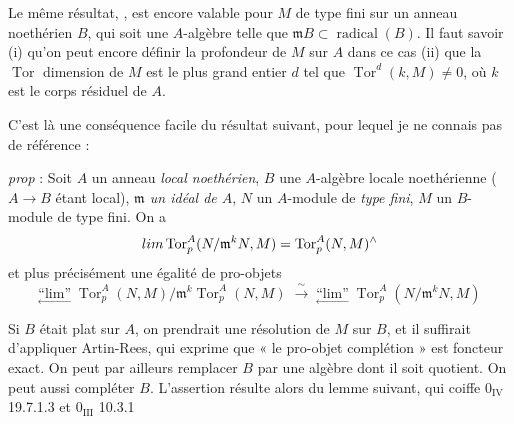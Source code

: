 \documentclass[11pt,a4paper]{article}
\begin{document}

Le même résultat, , est encore valable pour $M$ de type fini sur un
anneau  noethérien $B$, qui soit une $A$-algèbre telle que
$\mathfrak{m} B \subset \operatorname{radical}(B)$. Il faut savoir (i) qu'on
peut encore définir la profondeur de $M$ sur $A$ dans ce cas (ii) que la
$\operatorname{Tor}$ dimension de $M$ est le plus grand entier $d$ tel que
$\operatorname{Tor}^d(k, M) \neq 0$, où $k$ est le corps résiduel de $A$.

C'est là une conséquence facile du résultat suivant, pour lequel je ne
connais pas de référence :

\emph{prop} : Soit $A$ un anneau \emph{local noethérien}, $B$ une
$A$-algèbre locale noethérienne ($A \to B$ étant local),
\emph{$\mathfrak{m}$ un idéal de $A$}, $N$ un $A$-module de
\emph{type fini}, $M$ un $B$-module de type fini. On a
\[
  \varprojlim \operatorname{Tor}_p^A(N / \mathfrak{m}^k N, M)
  = \operatorname{Tor}_p^A(N, M)^{\wedge}
\]
et plus précisément une égalité de pro-objets
\[
  \underset{\longleftarrow}{\text{“lim”}}\;
  \operatorname{Tor}_p^A(N, M) \big/ \mathfrak{m}^k \operatorname{Tor}_p^A(N, M)
  \;\xrightarrow{\ \sim\ }\;
  \underset{\longleftarrow}{\text{“lim”}}\;
  \operatorname{Tor}_p^A(N / \mathfrak{m}^k N, M)
\]

Si $B$ était plat sur $A$, on prendrait une résolution de $M$ sur $B$, et il
suffirait d'appliquer Artin-Rees, qui exprime que « le pro-objet complétion »
est foncteur exact. On peut par ailleurs remplacer $B$ par une algèbre dont
il soit quotient. On peut aussi compléter $B$. L'assertion résulte alors du
lemme suivant, qui coiffe $0_{\mathrm{IV}}$ 19.7.1.3 et $0_{\mathrm{III}}$
10.3.1

\end{document}
